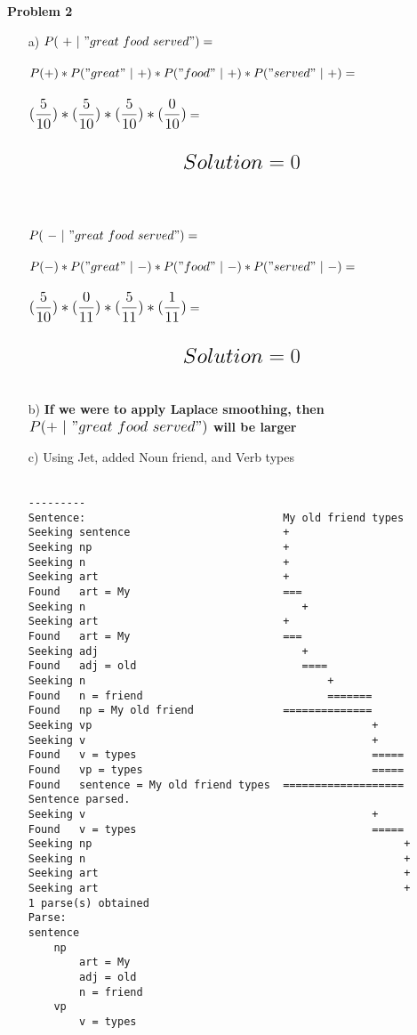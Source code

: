 \documentclass[ruled]{article}
\begin{document}
\newpage
\textbf{Problem 2}
\begin{itemize}
\item[a) ]
$P(\ +\ |\ "great\ food\ served") = $ \\ \\
$P(+) * P("great"\ |\ +) * P("food"\ |\ +) * P("served"\ |\ +) = $ \\ \\
$\mathlarger{\mathlarger{(\frac{5}{10}) * (\frac{5}{10}) * (\frac{5}{10}) * (\frac{0}{10})}} = $\\ \\
$$\mathlarger{\mathlarger{\mathlarger{Solution = 0}}}$$\\
\\ \\ 
$P(\ -\ |\ "great\ food\ served") = $ \\ \\
$P(-) * P("great"\ |\ -) * P("food"\ |\ -) * P("served"\ |\ -) = $ \\ \\
$\mathlarger{\mathlarger{(\frac{5}{10}) * (\frac{0}{11}) * (\frac{5}{11}) * (\frac{1}{11})}} = $\\ \\
$$\mathlarger{\mathlarger{\mathlarger{Solution = 0}}}$$\\
\item[b) ]
\textbf{If we were to apply Laplace smoothing, then $\mathlarger{\mathlarger{P(+\ |\ "great\ food\ served")}}$ will be larger}
\item[c) ] Using Jet, added Noun friend, and Verb types\\ \\
\begin{verbatim}
---------
Sentence:                               My old friend types
Seeking sentence                        +
Seeking np                              +
Seeking n                               +
Seeking art                             +
Found   art = My                        ===
Seeking n                                  +
Seeking art                             +
Found   art = My                        ===
Seeking adj                                +
Found   adj = old                          ====
Seeking n                                      +
Found   n = friend                             =======
Found   np = My old friend              ==============
Seeking vp                                            +
Seeking v                                             +
Found   v = types                                     =====
Found   vp = types                                    =====
Found   sentence = My old friend types  ===================
Sentence parsed.
Seeking v                                             +
Found   v = types                                     =====
Seeking np                                                 +
Seeking n                                                  +
Seeking art                                                +
Seeking art                                                +
1 parse(s) obtained
Parse:
sentence
    np
        art = My 
        adj = old 
        n = friend 
    vp
        v = types


\end{verbatim}
\end{itemize}
\end{document}
